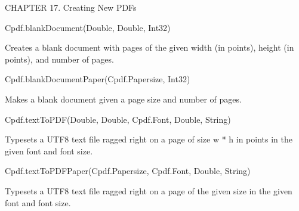 CHAPTER 17. Creating New PDFs

Cpdf.blankDocument(Double, Double, Int32)

Creates a blank document with pages of the given width (in points), height (in
points), and number of pages.

Cpdf.blankDocumentPaper(Cpdf.Papersize, Int32)

Makes a blank document given a page size and number of pages.

Cpdf.textToPDF(Double, Double, Cpdf.Font, Double, String)

Typesets a UTF8 text file ragged right on a page of size w * h in points in the
given font and font size.

Cpdf.textToPDFPaper(Cpdf.Papersize, Cpdf.Font, Double, String)

Typesets a UTF8 text file ragged right on a page of the given size in the given
font and font size.
